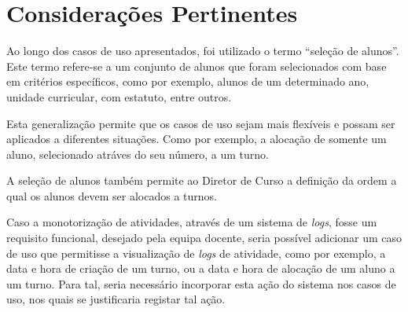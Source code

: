 \documentclass[a4paper,12pt]{scrreprt}
\begin{document}
\chapter{Considerações Pertinentes}
\vspace{1cm}

Ao longo dos casos de uso apresentados, foi utilizado o termo “seleção de alunos”.
Este termo refere-se a um conjunto de alunos que foram selecionados com base em critérios específicos,
como por exemplo, alunos de um determinado ano, unidade curricular, com estatuto, entre outros.

Esta generalização permite que os casos de uso sejam mais flexíveis
e possam ser aplicados a diferentes situações. Como por exemplo, a alocação de somente
um aluno, selecionado atráves do seu número, a um turno.

A seleção de alunos também permite ao Diretor de Curso a definição da ordem
a qual os alunos devem ser alocados a turnos.

\vspace{1cm}

Caso a monotorização de atividades, através de um sistema de \textit{logs}, fosse um requisito funcional,
desejado pela equipa docente, seria possível adicionar um caso de uso que permitisse a visualização
de \textit{logs} de atividade, como por exemplo, a data e hora de criação de um turno,
ou a data e hora de alocação de um aluno a um turno. Para tal, seria necessário
incorporar esta ação do sistema nos casos de uso, nos quais se justificaria registar tal ação.




%
%
\end{document}
